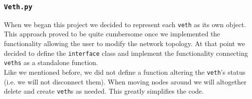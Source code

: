 \subsubsection{\texttt{Veth.py}}
    When we began this project we decided to represent each \texttt{veth} as its own object. This approach proved to be quite cumbersome once we implemented the functionality allowing the user to modify the network topology. At that point we decided to define the \texttt{interface} class and implement the functionality connecting \texttt{veths} as a standalone function.\\

    Like we mentioned before, we did not define a function altering the \texttt{veth}'s status (i.e. we will not disconnect them). When moving nodes around we will altogether delete and create \texttt{veth}s as needed. This greatly simplifies the code.